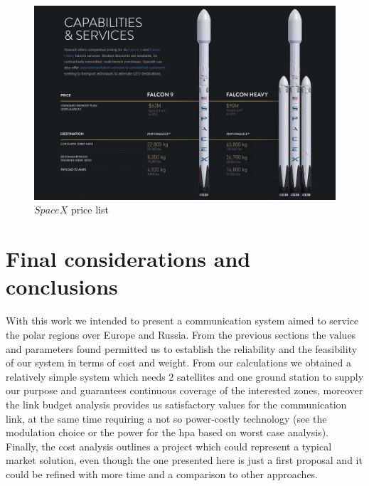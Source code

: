 \documentclass[11pt,a4paper,titlepage]{article}
\begin{document}
\begin{figure}
\centering
\includegraphics[width = .9\textwidth]{Spacex.png}
\caption{$SpaceX$ price list}
\label{fig:spacex}
\end{figure}

\section{Final considerations and conclusions}
	With this work we intended to present a communication system aimed to service the polar regions over Europe and Russia. From the previous sections the values and parameters found permitted us to establish the reliability and the feasibility of our system in terms of cost and weight. From our calculations we obtained a relatively simple system which needs 2 satellites and one ground station to supply our purpose and guarantees continuous coverage of the interested zones, moreover the link budget analysis provides us satisfactory values for the communication link, at the same time requiring a not so power-costly technology (see the modulation choice or the power for the \gls{hpa} based on worst case analysis). Finally, the cost analysis outlines a project which could represent a typical market solution, even though the one presented here is just a first proposal and it could be refined with more time and a comparison to other approaches.



\end{document}
